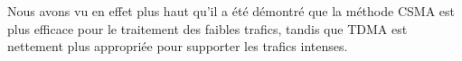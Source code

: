 



\cite{_evaluation_} Nous avons vu en effet plus haut qu’il a été démontré que la méthode CSMA est plus efficace pour le traitement des faibles trafics,
	tandis que TDMA est nettement plus appropriée pour supporter les trafics intenses.




